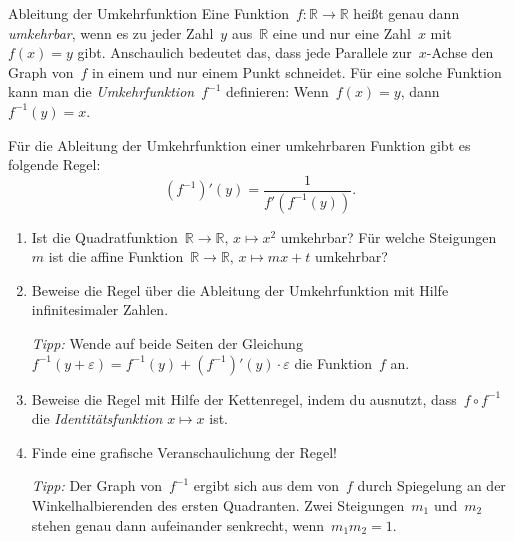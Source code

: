 \documentclass{zirkelblatt}
\newcommand{\RR}{\mathbb{R}}
\theoremstyle{definition}
\theoremstyle{plain}
\theoremstyle{remark}
\begin{document}
\begin{aufgabeShaded}{Ableitung der Umkehrfunktion}
Eine Funktion~$f : \RR \to \RR$ heißt genau dann \emph{umkehrbar}, wenn es zu
jeder Zahl~$y$ aus~$\RR$ eine und nur eine Zahl~$x$ mit~$f(x) = y$ gibt.
Anschaulich bedeutet das, dass jede Parallele zur~$x$-Achse den Graph von~$f$
in einem und nur einem Punkt schneidet. Für eine solche Funktion kann man die
\emph{Umkehrfunktion}~$f^{-1}$ definieren: Wenn~$f(x) = y$, dann~$f^{-1}(y) =
x$.

Für die Ableitung der Umkehrfunktion einer umkehrbaren Funktion gibt es
folgende Regel:
\[ (f^{-1})'(y) = \frac{1}{f'(f^{-1}(y))}. \]
\begin{enumerate}
\item Ist die Quadratfunktion~$\RR \to \RR,\,x \mapsto x^2$ umkehrbar?
Für welche Steigungen~$m$ ist die affine Funktion~$\RR \to \RR,\,x \mapsto mx+t$
umkehrbar?

\item Beweise die Regel über die Ableitung der Umkehrfunktion mit Hilfe
infinitesimaler Zahlen.

\emph{Tipp:} Wende auf beide Seiten der Gleichung~$f^{-1}(y+\varepsilon) =
f^{-1}(y) + (f^{-1})'(y) \cdot \varepsilon$ die Funktion~$f$ an.

\item Beweise die Regel mit Hilfe der Kettenregel, indem du ausnutzt, dass~$f
\circ f^{-1}$ die \emph{Identitätsfunktion} $x \mapsto x$ ist.

\item Finde eine grafische Veranschaulichung der Regel!

\emph{Tipp:} Der Graph von~$f^{-1}$ ergibt sich aus dem von~$f$ durch
Spiegelung an der Winkelhalbierenden des ersten Quadranten. Zwei
Steigungen~$m_1$ und~$m_2$ stehen genau dann aufeinander senkrecht, wenn~$m_1
m_2 = 1$.
\end{enumerate}
\end{aufgabeShaded}
\end{document}
